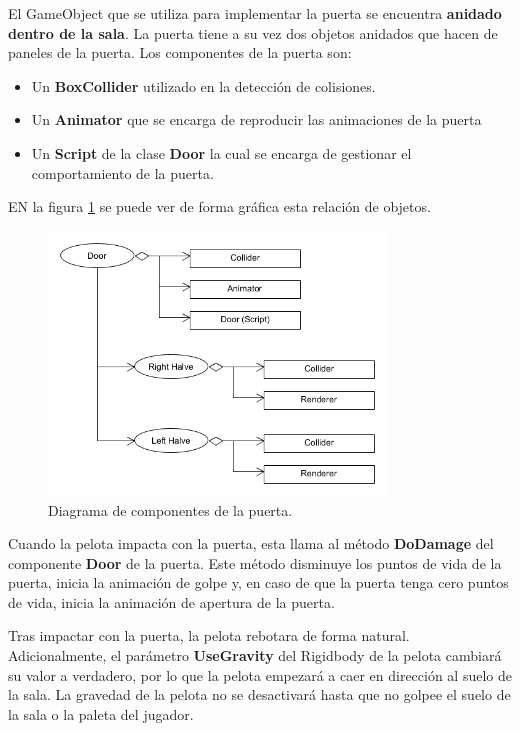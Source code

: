 El GameObject que se utiliza para implementar la puerta se encuentra \textbf{anidado dentro de la sala}. La puerta tiene a su vez dos objetos anidados que hacen de paneles de la puerta. Los componentes de la puerta son:
\begin{itemize}
\item Un \textbf{BoxCollider} utilizado en la detección de colisiones.
\item Un \textbf{Animator} que se encarga de reproducir las animaciones de la puerta
\item Un \textbf{Script} de la clase \textbf{Door} la cual se encarga de gestionar el comportamiento de la puerta.
\end{itemize}
EN la figura \ref{puerta_diagrama} se puede ver de forma gráfica esta relación de objetos.
\begin{figure}[h]
	\includegraphics[width=0.8\textwidth]{images/estructura/fisica/door}
	\centering
	\caption{Diagrama de componentes de la puerta.}
	\label{puerta_diagrama}
\end{figure}

Cuando la pelota impacta con la puerta, esta llama al método \textbf{DoDamage} del componente \textbf{Door} de la puerta. Este método disminuye los puntos de vida de la puerta, inicia la animación de golpe y, en caso de que la puerta tenga cero puntos de vida, inicia la animación de apertura de la puerta.

Tras impactar con la puerta, la pelota rebotara de forma natural. Adicionalmente, el parámetro \textbf{UseGravity} del Rigidbody de la pelota cambiará su valor a verdadero, por lo que la pelota empezará a caer en dirección al suelo de la sala. La gravedad de la pelota no se desactivará hasta que no golpee el suelo de la sala o la paleta del jugador.

